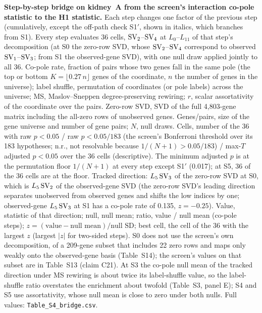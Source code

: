 \setcounter{table}{3}
\begin{table}[!htbp]
\centering\footnotesize
\caption{\textbf{Step-by-step bridge on kidney~A from the screen's interaction co-pole statistic to the H1 statistic.} Each step changes one factor of the previous step (cumulatively, except the off-path check S1$'$, shown in italics, which branches from S1). Every step evaluates 36 cells, $\SV{2}$--$\SV{4}$ at $L_0$--$L_{11}$ of that step's decomposition (at S0 the zero-row SVD, whose $\SV{2}$--$\SV{4}$ correspond to observed $\SV{1}$--$\SV{3}$; from S1 the observed-gene SVD), with one null draw applied jointly to all 36. Co-pole rate, fraction of pairs whose two genes fall in the same pole (the top or bottom $K = \lfloor 0.27\,n \rfloor$ genes of the coordinate, $n$ the number of genes in the universe); label shuffle, permutation of coordinates (or pole labels) across the universe; MS, Maslov--Sneppen degree-preserving rewiring; $r$, scalar assortativity of the coordinate over the pairs. Zero-row SVD, SVD of the full 4,803-gene matrix including the all-zero rows of unobserved genes. Genes/pairs, size of the gene universe and number of gene pairs; $N$, null draws. Cells, number of the 36 with raw $p < 0.05$ / raw $p < 0.05/183$ (the screen's Bonferroni threshold over its 183 hypotheses; n.r., not resolvable because $1/(N+1) > 0.05/183$) / max-$T$ adjusted $p < 0.05$ over the 36 cells (descriptive). The minimum adjusted $p$ is at the permutation floor $1/(N+1)$ at every step except S1$'$ (0.017); at S5, 36 of the 36 cells are at the floor. Tracked direction: $L_5\,\SV{3}$ of the zero-row SVD at S0, which is $L_5\,\SV{2}$ of the observed-gene SVD (the zero-row SVD's leading direction separates unobserved from observed genes and shifts the low indices by one; observed-gene $L_5\,\SV{3}$ at S1 has a co-pole rate of 0.135, $z = -0.25$). Value, statistic of that direction; null, null mean; ratio, value / null mean (co-pole steps); $z = (\text{value} - \text{null mean})/\text{null SD}$; best cell, the cell of the 36 with the largest $z$ (largest $|z|$ for two-sided steps). S0 does not use the screen's own decomposition, of a 209-gene subset that includes 22 zero rows and maps only weakly onto the observed-gene basis (Table~S14); the screen's values on that subset are in Table~S13 (claim C21). At S3 the co-pole null mean of the tracked direction under MS rewiring is about twice its label-shuffle value, so the label-shuffle ratio overstates the enrichment about twofold (Table~S3, panel E); S4 and S5 use assortativity, whose null mean is close to zero under both nulls. Full values: \texttt{Table\_S4\_bridge.csv}.}\label{tab:S4}

\end{table}
